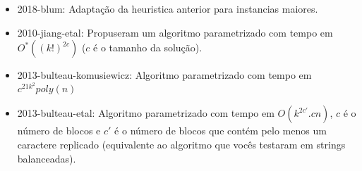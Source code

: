 {\begin{itemize}
    \item 2018-blum\cite{blum_minimum_2018}: Adaptação da heuristica anterior para instancias maiores.
    \item 2010-jiang-etal\cite{jiang_minimum_2012}: Propuseram um algoritmo parametrizado com tempo em $O^*((k!)^{2c})$ ($c$ é o tamanho da solução).
    \item 2013-bulteau-komusiewicz\cite{bulteau_minimum_2014}: Algoritmo parametrizado com tempo em $c^{21k^2} poly(n)$
    \item 2013-bulteau-etal\cite{bulteau_fixed-parameter_2013}: Algoritmo parametrizado com tempo em $O(k^{2c'} . cn)$, $c$ é o número de blocos e $c'$ é o número de blocos que contém pelo menos um caractere replicado (equivalente ao algoritmo que vocês testaram em strings balanceadas).
\end{itemize}
}

